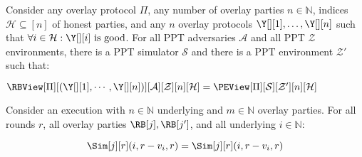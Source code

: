 \begin{conjecture}[Simulation]
  Consider any overlay protocol $\Pi$, any number of overlay parties $n \in \mathbb{N}$,
  indices $\mathcal{H} \subseteq [n]$ of honest parties,
  and any $n$ overlay protocols $\Y[][1], \ldots, \Y[][n]$
  such that $\forall i \in \mathcal{H}: \Y[][i] \text{ is good}$.
  For all PPT adversaries $\mathcal{A}$ and all PPT $\mathcal{Z}$ environments,
  there is a PPT simulator $\mathcal{S}$ and there is a PPT environment $\mathcal{Z}'$ such that:

  $\RBView[\Pi][({\Y[][1]}, \cdots, {\Y[][n]})][\mathcal{A}][\mathcal{Z}][n][\mathcal{H}]
   =
   \PEView[\Pi][\mathcal{S}][\mathcal{Z}'][n][\mathcal{H}]$
\end{conjecture}

\begin{conjecture}
  Consider an \rollerblade execution with $n \in \mathbb{N}$ underlying
  and $m \in \mathbb{N}$ overlay parties.
  For all rounds $r$, all overlay parties $\RB[j], \RB[j']$,
  and all underlying $i \in \mathbb{N}$:

  \[
    \Sim[j][r](i, r - v_i, r) = \Sim[j][r](i, r - v_i, r)
  \]
\end{conjecture}

